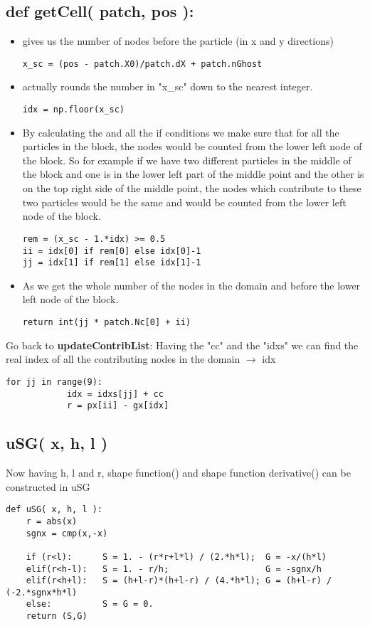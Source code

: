 \documentclass[11pt,fleqn]{book} %
\begin{document}
\subsection{def getCell( patch, pos ):}
\begin{itemize}
\item {} gives us the number of nodes before the particle (in x and y directions)
\begin{lstlisting}
x_sc = (pos - patch.X0)/patch.dX + patch.nGhost
\end{lstlisting}
\item {} actually rounds the number in "x\_sc" down to the nearest integer.
\begin{lstlisting}
idx = np.floor(x_sc)
\end{lstlisting}
\item By calculating the  and all the if conditions we make sure that for all the particles in the block, the nodes would be counted from the lower left node of the block. So for example if we have two different particles in the middle of the block and one is in the lower left part of the middle point and the other is on the top right side of the middle point, the nodes which contribute to these two particles would be the same and would be counted from the lower left node of the block.
\begin{lstlisting}
rem = (x_sc - 1.*idx) >= 0.5
ii = idx[0] if rem[0] else idx[0]-1
jj = idx[1] if rem[1] else idx[1]-1
\end{lstlisting}

\item As  we get the whole number of the nodes in the domain and before the lower left node of the block.
\begin{lstlisting}
return int(jj * patch.Nc[0] + ii)
\end{lstlisting}
\end{itemize}
Go back to \textbf{updateContribList}:
Having the "cc" and the "idxs" we can find the real index of all the contributing nodes in the domain $\rightarrow$ idx
\begin{lstlisting}
for jj in range(9):	
            idx = idxs[jj] + cc 
            r = px[ii] - gx[idx]
\end{lstlisting}
\subsection{uSG( x, h, l )}
Now having h, l and r, shape function() and shape function derivative() can be constructed in uSG 
\begin{lstlisting}
def uSG( x, h, l ):
    r = abs(x)
    sgnx = cmp(x,-x)
	
    if (r<l):      S = 1. - (r*r+l*l) / (2.*h*l);  G = -x/(h*l)
    elif(r<h-l):   S = 1. - r/h;                   G = -sgnx/h
    elif(r<h+l):   S = (h+l-r)*(h+l-r) / (4.*h*l); G = (h+l-r) / (-2.*sgnx*h*l)
    else:          S = G = 0.
    return (S,G)
\end{lstlisting}
\end{document}
